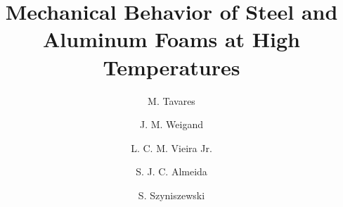 \documentclass[review]{elsarticle}
\begin{document}
\begin{frontmatter}

\title{Mechanical Behavior of Steel and Aluminum Foams at High Temperatures}


\author[mymainaddress]{M. Tavares}
\author[mysecondaryaddress]{J. M. Weigand}
\author[mymainaddress]{L. C. M. Vieira Jr.}
\author[mymainaddress]{S. J. C. Almeida}
\author[mythirdaddress]{S. Szyniszewski}

\address[mymainaddress]{Department of Structural Engineering, State University of Campinas, Campinas, Brazil}
\address[mysecondaryaddress]{National Institute of Standards and Technology (NIST), Gaithersburg, Maryland, USA}
\address[mythirdaddress]{Department of Engineering, Durham University, Durham, UK}



\end{frontmatter}
\end{document}
